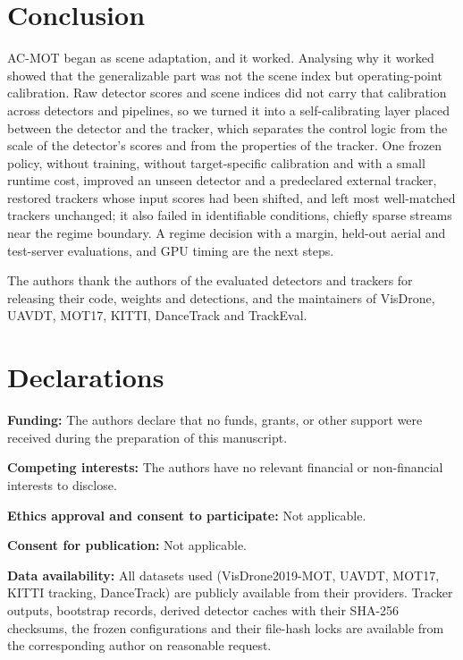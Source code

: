 \documentclass[pdflatex,sn-mathphys-num]{sn-jnl}
\begin{document}
\section{Conclusion}\label{sec:conclusion}
AC-MOT began as scene adaptation, and it worked. Analysing why it worked showed that the generalizable part was not the scene index but operating-point calibration. Raw detector scores and scene indices did not carry that calibration across detectors and pipelines, so we turned it into a self-calibrating layer placed between the detector and the tracker, which separates the control logic from the scale of the detector's scores and from the properties of the tracker. One frozen policy, without training, without target-specific calibration and with a small runtime cost, improved an unseen detector and a predeclared external tracker, restored trackers whose input scores had been shifted, and left most well-matched trackers unchanged; it also failed in identifiable conditions, chiefly sparse streams near the regime boundary. A regime decision with a margin, held-out aerial and test-server evaluations, and GPU timing are the next steps.

\backmatter

The authors thank the authors of the evaluated detectors and trackers for releasing their code, weights and detections, and the maintainers of VisDrone, UAVDT, MOT17, KITTI, DanceTrack and TrackEval.

\section*{Declarations}

\noindent\textbf{Funding:} The authors declare that no funds, grants, or other support were received during the preparation of this manuscript.

\noindent\textbf{Competing interests:} The authors have no relevant financial or non-financial interests to disclose.

\noindent\textbf{Ethics approval and consent to participate:} Not applicable.

\noindent\textbf{Consent for publication:} Not applicable.

\noindent\textbf{Data availability:} All datasets used (VisDrone2019-MOT, UAVDT, MOT17, KITTI tracking, DanceTrack) are publicly available from their providers. Tracker outputs, bootstrap records, derived detector caches with their SHA-256 checksums, the frozen configurations and their file-hash locks are available from the corresponding author on reasonable request.
\end{document}
